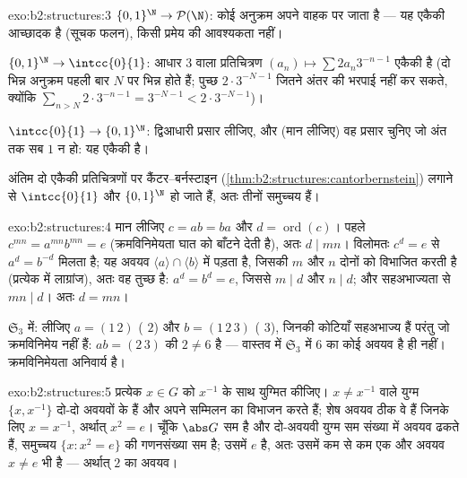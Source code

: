 \begin{solution}{exo:b2:structures:3}
$\{0,1\}^{\N} \to \mathcal{P}(\N)$: कोई अनुक्रम अपने वाहक पर जाता है --- यह एकैकी आच्छादक है (सूचक
फलन), किसी प्रमेय की आवश्यकता नहीं।

$\{0,1\}^{\N} \to \intcc{0}{1}$: आधार $3$ वाला प्रतिचित्रण $(a_n) \mapsto
\sum 2a_n 3^{-n-1}$ एकैकी है (दो भिन्न अनुक्रम पहली बार
 $N$ पर भिन्न होते हैं; पुच्छ $2\cdot
3^{-N-1}$ जितने अंतर की भरपाई नहीं कर
सकते, क्योंकि $\sum_{n > N} 2\cdot 3^{-n-1} = 3^{-N-1} <
2\cdot3^{-N-1}$)।

$\intcc{0}{1} \to \{0,1\}^{\N}$: द्विआधारी प्रसार लीजिए, और (मान लीजिए) वह प्रसार चुनिए जो अंत तक
सब $1$ न हो: यह एकैकी है।

अंतिम दो एकैकी प्रतिचित्रणों पर कैंटर--बर्नस्टाइन (\cref{thm:b2:structures:cantorbernstein}) लगाने से $\intcc{0}{1}$
और $\{0,1\}^{\N}$  हो जाते हैं, अतः तीनों समुच्चय  हैं।
\end{solution}

\begin{solution}{exo:b2:structures:4}
मान लीजिए $c = ab = ba$ और $d = \operatorname{ord}(c)$। पहले $c^{mn} =
a^{mn} b^{mn} = e$ (क्रमविनिमेयता घात को बाँटने देती है),
अतः $d
\mid mn$। विलोमतः $c^d = e$ से $a^d = b^{-d}$ मिलता है; यह अवयव $\langle a\rangle \cap \langle b\rangle$ में पड़ता है, जिसकी
 $m$ और $n$ दोनों को विभाजित करती है (प्रत्येक  में
लाग्रांज), अतः वह तुच्छ है: $a^d = b^d = e$, जिससे $m \mid d$ और $n \mid d$; और सहअभाज्यता से
$mn \mid d$। अतः $d = mn$।

$\mathfrak{S}_3$ में: लीजिए $a = (1\,2)$ ( $2$) और $b =
(1\,2\,3)$ ( $3$), जिनकी कोटियाँ
सहअभाज्य हैं परंतु जो क्रमविनिमेय नहीं हैं: $ab =
(2\,3)$ की  $2 \neq 6$ है ---
वास्तव में $\mathfrak{S}_3$ में  $6$ का कोई अवयव है ही नहीं। क्रमविनिमेयता
अनिवार्य है।
\end{solution}

\begin{solution}{exo:b2:structures:5}
प्रत्येक $x \in G$ को $x^{-1}$ के साथ युग्मित कीजिए। $x \neq x^{-1}$ वाले युग्म $\{x, x^{-1}\}$ दो-दो
अवयवों के हैं और अपने सम्मिलन का विभाजन करते हैं; शेष अवयव ठीक वे हैं
जिनके लिए $x = x^{-1}$, अर्थात् $x^2 =
e$। चूँकि $\abs G$ सम है और दो-अवयवी युग्म सम
संख्या में अवयव ढकते हैं, समुच्चय $\{x : x^2 = e\}$ की गणनसंख्या सम है; उसमें $e$
है, अतः उसमें कम से कम एक और अवयव $x \neq
e$ भी है --- अर्थात्  $2$ का
अवयव।
\end{solution}

